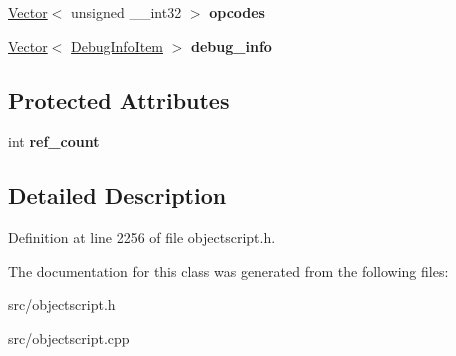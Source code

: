 \begin{DoxyCompactItemize}
\item 
\hyperlink{struct_object_script_1_1_o_s_1_1_vector}{Vector}$<$ unsigned \+\_\+\+\_\+int32 $>$ {\bfseries opcodes}\hypertarget{class_object_script_1_1_o_s_1_1_core_1_1_program_a597823304ac20e7ed52140dda2d2211b}{}\label{class_object_script_1_1_o_s_1_1_core_1_1_program_a597823304ac20e7ed52140dda2d2211b}

\item 
\hyperlink{struct_object_script_1_1_o_s_1_1_vector}{Vector}$<$ \hyperlink{struct_object_script_1_1_o_s_1_1_core_1_1_program_1_1_debug_info_item}{Debug\+Info\+Item} $>$ {\bfseries debug\+\_\+info}\hypertarget{class_object_script_1_1_o_s_1_1_core_1_1_program_a9db112c2831a4a0561e5660eceed42fa}{}\label{class_object_script_1_1_o_s_1_1_core_1_1_program_a9db112c2831a4a0561e5660eceed42fa}

\end{DoxyCompactItemize}
\subsection*{Protected Attributes}
\begin{DoxyCompactItemize}
\item 
int {\bfseries ref\+\_\+count}\hypertarget{class_object_script_1_1_o_s_1_1_core_1_1_program_adc5609067ccb0fe957a4e150a581d390}{}\label{class_object_script_1_1_o_s_1_1_core_1_1_program_adc5609067ccb0fe957a4e150a581d390}

\end{DoxyCompactItemize}


\subsection{Detailed Description}


Definition at line 2256 of file objectscript.\+h.



The documentation for this class was generated from the following files\+:\begin{DoxyCompactItemize}
\item 
src/objectscript.\+h\item 
src/objectscript.\+cpp\end{DoxyCompactItemize}
